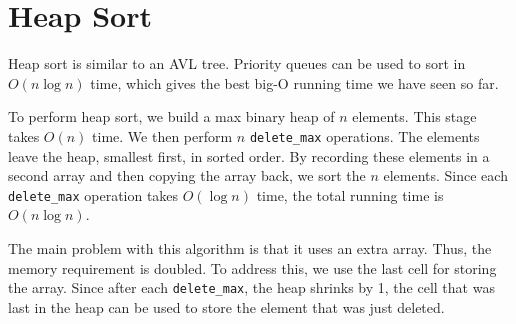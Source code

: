 \section{Heap Sort}
Heap sort is similar to an AVL tree. Priority queues can be used to sort in \(O(n \log n)\) time, which gives the best big-O running time we have seen so far.

To perform heap sort, we build a max binary heap of \(n\) elements. This stage takes \(O(n)\) time. We then perform \(n\) \texttt{delete\_max} operations. The elements leave the heap, smallest first, in sorted order. By recording these elements in a second array and then copying the array back, we sort the \(n\) elements. Since each \texttt{delete\_max} operation takes \(O(\log n)\) time, the total running time is \(O(n \log n)\).

The main problem with this algorithm is that it uses an extra array. Thus, the memory requirement is doubled. To address this, we use the last cell for storing the array. Since after each \texttt{delete\_max}, the heap shrinks by 1, the cell that was last in the heap can be used to store the element that was just deleted.

